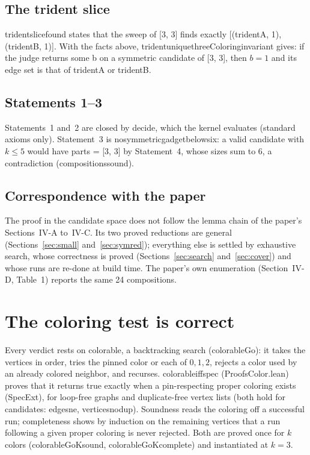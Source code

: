 \documentclass[11pt,a4paper]{article}
\newcommand{\leanus}{\textunderscore\allowbreak}
\newcommand{\lean}[1]{{\ttfamily\let\_\leanus #1}}
\theoremstyle{definition}
\begin{document}
\subsection{The trident slice}\label{sec:slice}
\lean{trident\_slice\_found} states that the sweep of \lean{[3, 3]} finds
exactly \lean{[(tridentA, 1), (tridentB, 1)]}. With the facts above,
\lean{trident\_unique\_threeColoring\_invariant} gives: if the judge returns
\lean{some b} on a symmetric candidate of \lean{[3, 3]}, then $b=1$ and its
edge set is that of \lean{tridentA} or \lean{tridentB}.

\subsection{Statements 1--3}
Statements~1 and~2 are closed by \lean{decide}, which the kernel evaluates
(standard axioms only). Statement~3 is \lean{no\_symmetric\_gadget\_below\_six}:
a valid candidate with $k\le5$ would have \lean{parts = [3, 3]} by Statement~4,
whose sizes sum to $6$, a contradiction (\lean{compositions\_sound}).

\subsection{Correspondence with the paper}
The proof in the candidate space does not follow the lemma chain of the
paper's Sections~IV-A to~IV-C. Its two proved reductions are general (Sections~\ref{sec:small}
and~\ref{sec:symred}); everything else is settled by exhaustive search,
whose correctness is proved (Sections~\ref{sec:search} and~\ref{sec:cover})
and whose runs are re-done at build time. The paper's own enumeration
(Section~IV-D, Table~1) reports the same 24 compositions.

\section{The coloring test is correct}\label{sec:color}
Every verdict rests on \lean{colorable}, a backtracking search
(\lean{colorableGo}): it takes the vertices in order, tries the pinned color
or each of $0,1,2$, rejects a color used by an already colored neighbor, and
recurses. \lean{colorable\_iff\_spec} (\lean{ProofsColor.lean}) proves that it
returns \lean{true} exactly when a pin-respecting proper coloring exists
(\lean{SpecExt}), for loop-free graphs and duplicate-free vertex lists (both
hold for candidates: \lean{edges\_ne}, \lean{vertices\_nodup}). Soundness
reads the coloring off a successful run; completeness shows by induction on
the remaining vertices that a run following a given proper coloring is never
rejected. Both are proved once for $k$ colors (\lean{colorableGoK\_sound},
\lean{colorableGoK\_complete}) and instantiated at $k=3$.
\end{document}
